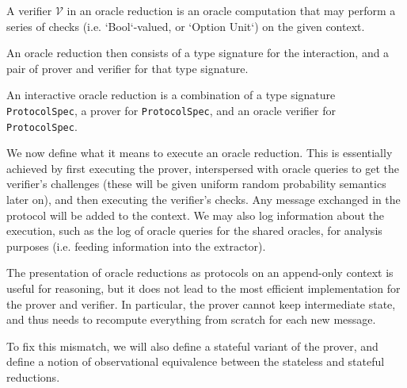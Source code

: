 \begin{definition}
    \label{def:verifier_type_signature}
    A verifier $\mathcal{V}$ in an oracle reduction is an oracle computation that may perform a
    series of checks (i.e. `Bool`-valued, or `Option Unit`) on the given context.
\end{definition}


An oracle reduction then consists of a type signature for the interaction, and a pair of prover and
verifier for that type signature.


\begin{definition}
    \label{def:interactive_oracle_reduction}
    An interactive oracle reduction is a combination of a type signature \verb|ProtocolSpec|, a prover for \verb|ProtocolSpec|, and an oracle verifier for \verb|ProtocolSpec|.
\end{definition}

We now define what it means to execute an oracle reduction. This is essentially achieved by first
executing the prover, interspersed with oracle queries to get the verifier's challenges (these will
be given uniform random probability semantics later on), and then executing the verifier's checks.
Any message exchanged in the protocol will be added to the context. We may also log information
about the execution, such as the log of oracle queries for the shared oracles, for analysis purposes
(i.e. feeding information into the extractor).

\begin{definition}
    \label{def:oracle_reduction_execution}
\end{definition}

\begin{remark}
    The presentation of oracle reductions as protocols on an append-only context is useful for
    reasoning, but it does not lead to the most efficient implementation for the prover and
    verifier. In particular, the prover cannot keep intermediate state, and thus needs to recompute
    everything from scratch for each new message.

    To fix this mismatch, we will also define a stateful variant of the prover, and define a notion
    of observational equivalence between the stateless and stateful reductions.
\end{remark}

